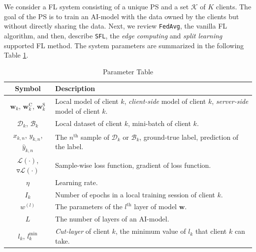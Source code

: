 \documentclass[10pt,journal,transmag]{IEEEtran}
\begin{document}
We consider a FL system consisting of a unique PS and a set $\mathcal{K}$ of $K$ clients.
The goal of the PS is to train an AI-model with the data owned by the clients but without directly sharing the data. Next, we review \texttt{FedAvg}, the vanilla FL algorithm, and then, describe \texttt{SFL}, the \textit{edge computing} and \textit{split learning} supported FL method. The system parameters are summarized in the following Table \ref{tab:parameter}.

\begin{table}[!htbp]
\newcommand{\tabincell}[2]{\begin{tabular}{@{}#1@{}}#2\end{tabular}}  
\begin{center}
    \caption{Parameter Table}
    \label{tab:parameter}
    \begin{tabular}{cp{2.54in}}
        \toprule
        Symbol & Description \\
        \midrule
        
        $\textbf{w}_k$, $\textbf{w}^\text{C}_k$, $\textbf{w}^\text{S}_k$ & Local model of client $k$, \textit{client-side} model of client $k$, \textit{server-side} model of client $k$. \\
        
        $\mathcal{D}_k$, $\mathcal{B}_k$ & Local dataset of client $k$, mini-batch of client $k$. \\
        
        $x_{k, n}$, $y_{k, n}$, $\hat{y}_{k, n}$ & The $n^\text{th}$ sample of $\mathcal{D}_k$ or $\mathcal{B}_k$, ground-true label, prediction of the label.\\
        
        $\mathcal{L}(\cdot)$, $\triangledown \mathcal{L}(\cdot)$ & Sample-wise loss function, gradient of loss function.\\
        
        $\eta$ & Learning rate.\\
        
        $I_k$ & Number of epochs in a local training session of client $k$.\\

        $w^{(l)}$ & The parameters of the $l^\text{th}$ layer of model $\textbf{w}$. \\

        $L$ & The number of layers of an AI-model. \\
        
        $l_k$, $l_k^\text{min}$ & \textit{Cut-layer} of client $k$, the minimum value of $l_k$ that client $k$ can take. \\
        

\end{tabular}
\end{center}
\end{table}
\end{document}
